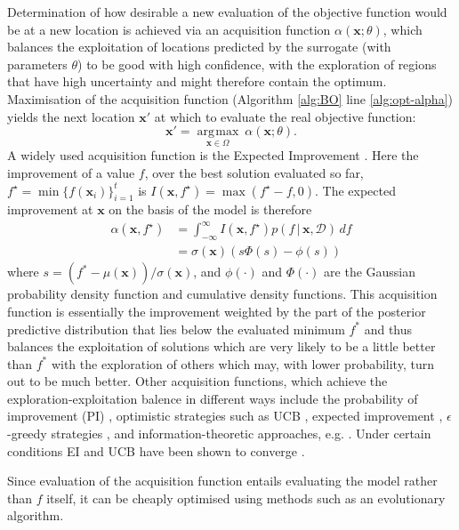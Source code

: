 \documentclass[conference]{IEEEtran}
\DeclareMathOperator*{\argmax}{\arg\!\max}
\newcommand\ei{EI\xspace}
\newcommand{\given}{\,|\,}
\newcommand{\bx}{\mathbf{x}}
\newcommand{\data}{\mathcal{D}}
\begin{document}
Determination of how desirable a new evaluation of the objective function
would be at a new location is achieved via an acquisition function $\alpha(\mathbf{x};  \theta)$, which balances the exploitation of locations predicted by the surrogate (with parameters $\theta$) to be good with high confidence, with the exploration of regions that have high uncertainty and might therefore contain the optimum. Maximisation of the acquisition function (Algorithm \ref{alg:BO} line \ref{alg:opt-alpha}) yields the next location $\bx'$ at which to evaluate the real objective function: 
\begin{equation}\label{eqn: argmax_alpha}
   \bx' = \underset{\mathbf{x} \in \Omega}{\argmax}\:\alpha(\mathbf{x};  \theta).
 \end{equation}
 A widely used acquisition function is the Expected Improvement
 \cite{jones1998efficient}.  Here the improvement of a value $f$, over the best solution
 evaluated so far, $f^\star = \min \{f(\bx_i)\}_{i=1}^t$ is $I(\bx,
 f^\star) = \max(f^\star -f, 0)$.  The expected improvement at $\bx$ on the basis of
 the model is therefore
 \begin{align}
  \label{eq:EI}
    \alpha(\bx, f^\star) &= \int_{-\infty}^\infty  I(\bx, f^\star) p(f \given \bx,
   \data)\,df \\
   &= \sigma(\bx) \left( s\Phi( s) - \phi (s)\right) \label{eq:ei-closed-form}
\end{align}
 where $s = (f^* - \mu(\bx)) / \sigma(\bx)$, and $\phi(\cdot)$ and
 $\Phi(\cdot)$ are the Gaussian probability density function and cumulative
 density functions. This acquisition function is essentially the improvement
 weighted by the part of the posterior predictive distribution that lies
 below the evaluated minimum $f^*$ and thus balances the exploitation of
 solutions which are very likely to be a little better than $f^*$ with the
 exploration of others which may, with lower probability, turn out to be
 much better. Other acquisition functions, which achieve the
 exploration-exploitation balence in different ways include the probability
 of improvement (PI) \cite{kushner:ego}, optimistic strategies such as UCB
 \cite{srinivas:ucb:2010}, expected improvement \cite{jones1998efficient},
 $\epsilon$-greedy strategies \cite{bull2011convergence, death2019greed},
 and information-theoretic approaches, e.g. \cite{scott:kg:2011,
   ru:fitbo:2018}.  Under certain conditions \ei and UCB have been shown to converge
\cite{bull2011convergence, srinivas:ucb:2010}. 

 Since evaluation of the acquisition function entails evaluating the model
 rather than $f$ itself, it can be  cheaply optimised using methods such as
 an evolutionary algorithm.
\end{document}
